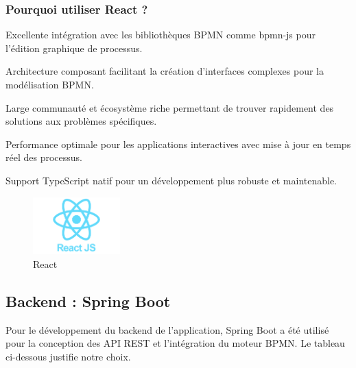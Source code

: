\subsubsection{Pourquoi utiliser React ?}
\begin{dinglist}{80}
    \item Excellente intégration avec les bibliothèques BPMN comme bpmn-js pour l'édition graphique de processus.
    \item Architecture composant facilitant la création d'interfaces complexes pour la modélisation BPMN.
    \item Large communauté et écosystème riche permettant de trouver rapidement des solutions aux problèmes spécifiques.
    \item Performance optimale pour les applications interactives avec mise à jour en temps réel des processus.
    \item Support TypeScript natif pour un développement plus robuste et maintenable.
\end{dinglist}

\begin{figure}[H]
    \centering
    \includegraphics[width=0.3\textwidth]{Images/react.png}
    \caption{React}
    \label{fig:react}
\end{figure}

\subsection{Backend : Spring Boot}

Pour le développement du backend de l'application, Spring Boot a été utilisé pour la conception des API REST et l'intégration du moteur BPMN. Le tableau ci-dessous justifie notre choix.

